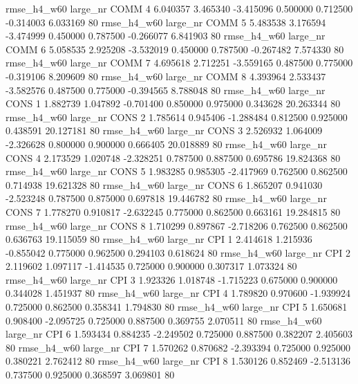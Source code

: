  rmse_h4_w60   large_nr     COMM                 4  6.040357  3.465340  -3.415096 0.500000 0.712500 -0.314003    6.033169 80
 rmse_h4_w60   large_nr     COMM                 5  5.483538  3.176594  -3.474999 0.450000 0.787500 -0.266077    6.841903 80
 rmse_h4_w60   large_nr     COMM                 6  5.058535  2.925208  -3.532019 0.450000 0.787500 -0.267482    7.574330 80
 rmse_h4_w60   large_nr     COMM                 7  4.695618  2.712251  -3.559165 0.487500 0.775000 -0.319106    8.209609 80
 rmse_h4_w60   large_nr     COMM                 8  4.393964  2.533437  -3.582576 0.487500 0.775000 -0.394565    8.788048 80
 rmse_h4_w60   large_nr     CONS                 1  1.882739  1.047892  -0.701400 0.850000 0.975000  0.343628   20.263344 80
 rmse_h4_w60   large_nr     CONS                 2  1.785614  0.945406  -1.288484 0.812500 0.925000  0.438591   20.127181 80
 rmse_h4_w60   large_nr     CONS                 3  2.526932  1.064009  -2.326628 0.800000 0.900000  0.666405   20.018889 80
 rmse_h4_w60   large_nr     CONS                 4  2.173529  1.020748  -2.328251 0.787500 0.887500  0.695786   19.824368 80
 rmse_h4_w60   large_nr     CONS                 5  1.983285  0.985305  -2.417969 0.762500 0.862500  0.714938   19.621328 80
 rmse_h4_w60   large_nr     CONS                 6  1.865207  0.941030  -2.523248 0.787500 0.875000  0.697818   19.446782 80
 rmse_h4_w60   large_nr     CONS                 7  1.778270  0.910817  -2.632245 0.775000 0.862500  0.663161   19.284815 80
 rmse_h4_w60   large_nr     CONS                 8  1.710299  0.897867  -2.718206 0.762500 0.862500  0.636763   19.115059 80
 rmse_h4_w60   large_nr      CPI                 1  2.414618  1.215936  -0.855042 0.775000 0.962500  0.294103    0.618624 80
 rmse_h4_w60   large_nr      CPI                 2  2.119602  1.097117  -1.414535 0.725000 0.900000  0.307317    1.073324 80
 rmse_h4_w60   large_nr      CPI                 3  1.923326  1.018748  -1.715223 0.675000 0.900000  0.344028    1.451937 80
 rmse_h4_w60   large_nr      CPI                 4  1.789820  0.970600  -1.939924 0.725000 0.862500  0.358341    1.794830 80
 rmse_h4_w60   large_nr      CPI                 5  1.650681  0.908400  -2.095725 0.725000 0.887500  0.369755    2.070511 80
 rmse_h4_w60   large_nr      CPI                 6  1.593434  0.884235  -2.249502 0.725000 0.887500  0.382207    2.405603 80
 rmse_h4_w60   large_nr      CPI                 7  1.570262  0.870682  -2.393394 0.725000 0.925000  0.380221    2.762412 80
 rmse_h4_w60   large_nr      CPI                 8  1.530126  0.852469  -2.513136 0.737500 0.925000  0.368597    3.069801 80
